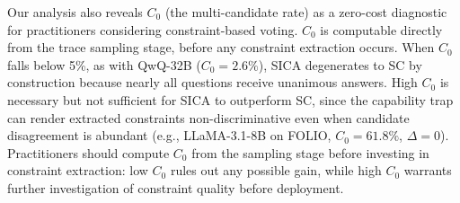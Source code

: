 Our analysis also reveals $C_0$ (the multi-candidate rate) as a zero-cost diagnostic for practitioners considering constraint-based voting. $C_0$ is computable directly from the trace sampling stage, before any constraint extraction occurs. When $C_0$ falls below 5\%, as with QwQ-32B ($C_0 = 2.6\%$), SICA degenerates to SC by construction because nearly all questions receive unanimous answers. High $C_0$ is necessary but not sufficient for SICA to outperform SC, since the capability trap can render extracted constraints non-discriminative even when candidate disagreement is abundant (e.g., LLaMA-3.1-8B on FOLIO, $C_0 = 61.8\%$, $\Delta = 0$). Practitioners should compute $C_0$ from the sampling stage before investing in constraint extraction: low $C_0$ rules out any possible gain, while high $C_0$ warrants further investigation of constraint quality before deployment.
